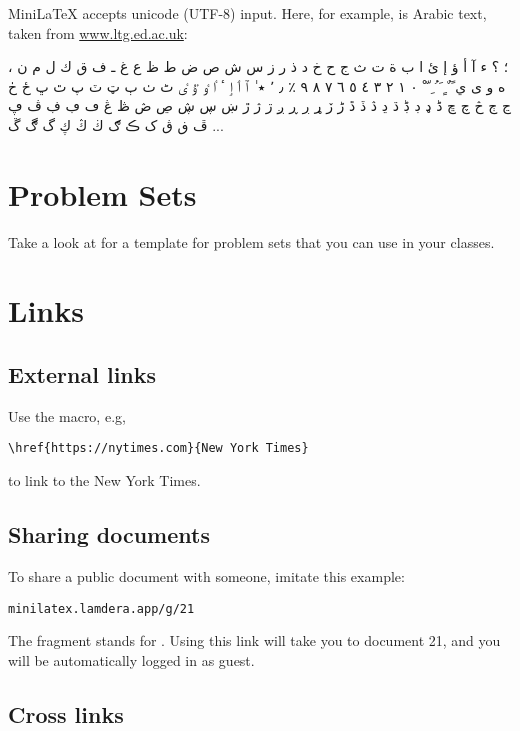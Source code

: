 MiniLaTeX accepts unicode (UTF-8) input.  Here, for example, is Arabic text,  taken from \href{https://www.ltg.ed.ac.uk/~richard/unicode-sample.html}{www.ltg.ed.ac.uk}:

، ؛ ؟ ء آ أ ؤ إ ئ ا ب ة ت ث ج ح خ د ذ ر ز س ش ص ض ط ظ ع غ ـ ف ق ك ل م ن ه و ى ي ً ٌ ٍ َ ُ ِ ّ ْ ٠ ١ ٢ ٣ ٤ ٥ ٦ ٧ ٨ ٩ ٪ ٫ ٬ ٭ ٰ ٱ ٲ ٳ ٴ ٵ ٶ ٷ ٸ ٹ ٺ ٻ ټ ٽ پ ٿ ڀ ځ ڂ ڃ ڄ څ چ ڇ ڈ ډ ڊ ڋ ڌ ڍ ڎ ڏ ڐ ڑ ڒ ړ ڔ ڕ ږ ڗ ژ ڙ ښ ڛ ڜ ڝ ڞ ڟ ڠ ڡ ڢ ڣ ڤ ڥ ڦ ڧ ڨ ک ڪ ګ ڬ ڭ ڮ گ ڰ ڱ ...


\section{Problem Sets}

Take a look at  for a template for problem sets that you can use in your classes.

\section{Links}

\subsection{External links}

Use the  macro, e.g,

\begin{verbatim}
\href{https://nytimes.com}{New York Times}
\end{verbatim}

to link to the New York Times.

\subsection{Sharing documents}

To share a public document with someone, imitate this example:

\begin{verbatim}
minilatex.lamdera.app/g/21
\end{verbatim}

The  fragment  stands for .  Using this link will take you to document 21, and you will be automatically logged in as guest.


\subsection{Cross links}

